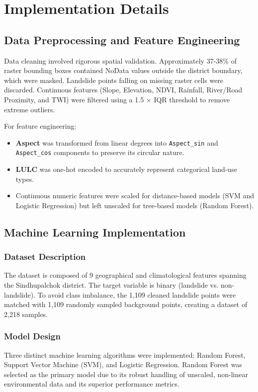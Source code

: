 \section{Implementation Details}

\subsection{Data Preprocessing and Feature Engineering}
Data cleaning involved rigorous spatial validation. Approximately 37-38\% of raster bounding boxes contained NoData values outside the district boundary, which were masked. Landslide points falling on missing raster cells were discarded. Continuous features (Slope, Elevation, NDVI, Rainfall, River/Road Proximity, and TWI) were filtered using a 1.5 $\times$ IQR threshold to remove extreme outliers. 

For feature engineering:
\begin{itemize}
    \item \textbf{Aspect} was transformed from linear degrees into \texttt{Aspect\_sin} and \texttt{Aspect\_cos} components to preserve its circular nature.
    \item \textbf{LULC} was one-hot encoded to accurately represent categorical land-use types.
    \item Continuous numeric features were scaled for distance-based models (SVM and Logistic Regression) but left unscaled for tree-based models (Random Forest).
\end{itemize}

\subsection{Machine Learning Implementation}

\subsubsection{Dataset Description}
The dataset is composed of 9 geographical and climatological features spanning the Sindhupalchok district. The target variable is binary (landslide vs. non-landslide). To avoid class imbalance, the 1,109 cleaned landslide points were matched with 1,109 randomly sampled background points, creating a dataset of 2,218 samples.

\subsubsection{Model Design}
Three distinct machine learning algorithms were implemented: Random Forest, Support Vector Machine (SVM), and Logistic Regression. Random Forest was selected as the primary model due to its robust handling of unscaled, non-linear environmental data and its superior performance metrics.

